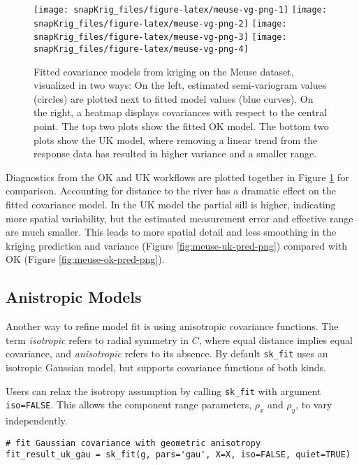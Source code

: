 \begin{figure}[!htb]
\texttt{[image: snapKrig\_files/figure-latex/meuse-vg-png-1]} \texttt{[image: snapKrig\_files/figure-latex/meuse-vg-png-2]} \texttt{[image: snapKrig\_files/figure-latex/meuse-vg-png-3]} \texttt{[image: snapKrig\_files/figure-latex/meuse-vg-png-4]} \caption{Fitted covariance models from kriging on the Meuse dataset, visualized in two ways: On the left, estimated semi-variogram values (circles) are plotted next to fitted model values (blue curves). On the right, a heatmap displays covariances with respect to the central point. The top two plots show the fitted OK model. The bottom two plots show the UK model, where removing a linear trend from the response data has resulted in higher variance and a smaller range.}\label{fig:meuse-vg-png}
\end{figure}

Diagnostics from the OK and UK workflows are plotted together in Figure \ref{fig:meuse-vg-png} for comparison. Accounting for distance to the river has a dramatic effect on the fitted covariance model. In the UK model the partial sill is higher, indicating more spatial variability, but the estimated measurement error and effective range are much smaller. This leads to more spatial detail and less smoothing in the kriging prediction and variance (Figure \ref{fig:meuse-uk-pred-png}) compared with OK (Figure \ref{fig:meuse-ok-pred-png}).

\hypertarget{anistropic-models}{%
\subsection{Anistropic Models}\label{anistropic-models}}

Another way to refine model fit is using anisotropic covariance functions. The term \emph{isotropic} refers to radial symmetry in \(C\), where equal distance implies equal covariance, and \emph{anisotropic} refers to its absence. By default \texttt{sk\_fit} uses an isotropic Gaussian model, but  supports covariance functions of both kinds.

Users can relax the isotropy assumption by calling \texttt{sk\_fit} with argument \texttt{iso=FALSE}. This allows the component range parameters, \(\rho_x\) and \(\rho_y\), to vary independently.

\begin{verbatim}
# fit Gaussian covariance with geometric anisotropy
fit_result_uk_gau = sk_fit(g, pars='gau', X=X, iso=FALSE, quiet=TRUE)
\end{verbatim}

